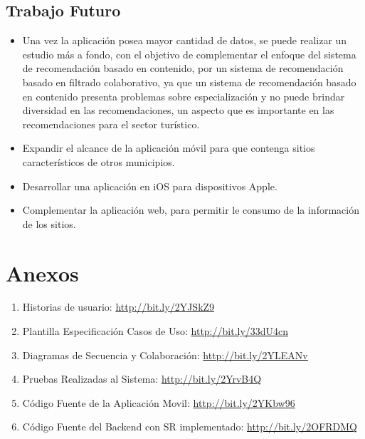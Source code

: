 \documentclass[12pt,letterpaper,openany]{book}
\begin{document}
\section{Trabajo Futuro}
\begin{itemize}
\item Una vez la aplicación posea mayor cantidad de datos, se puede realizar un estudio más a fondo, con el objetivo de complementar el enfoque del sistema de recomendación basado en contenido, por un sistema de recomendación basado en filtrado colaborativo, ya que un sistema de recomendación basado en contenido presenta problemas sobre especialización y no puede brindar diversidad en las recomendaciones, un aspecto que es importante en las recomendaciones para el sector turístico.
\item Expandir el alcance de la aplicación móvil para que contenga sitios característicos de otros municipios.
\item Desarrollar una aplicación en iOS para dispositivos Apple.
\item Complementar la aplicación web, para permitir le consumo de la información de los sitios.
\end{itemize}


\appendix
\chapter{Anexos}\label{aped.A}
\begin{enumerate}
    \item Historias de usuario: \url{http://bit.ly/2YJSkZ9}
    \item Plantilla Especificación Casos de Uso: \url{http://bit.ly/33dU4cn}
    \item Diagramas de Secuencia y Colaboración: \url{http://bit.ly/2YLEANv}
    \item Pruebas Realizadas al Sistema: \url{http://bit.ly/2YrvB4Q}
    \item Código Fuente de la Aplicación Movil: \url{http://bit.ly/2YKbw96}
    \item Código Fuente del Backend con SR implementado: \url{http://bit.ly/2OFRDMQ}	
\end{enumerate}
\end{document}
